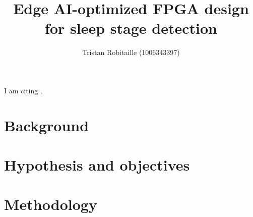\documentclass[12pt]{article}
\title{Edge AI-optimized FPGA design for sleep stage detection}
\author{Tristan Robitaille (1006343397)}
\date{}
\begin{document}
\maketitle

I am citing \cite{yao2023cnn}.

\thispagestyle{fancy}

\section{Background}
\lipsum[2]

\section{Hypothesis and objectives}
\lipsum[2]

\section{Methodology}
\lipsum[2]

\newpage
\printbibliography
\end{document}
